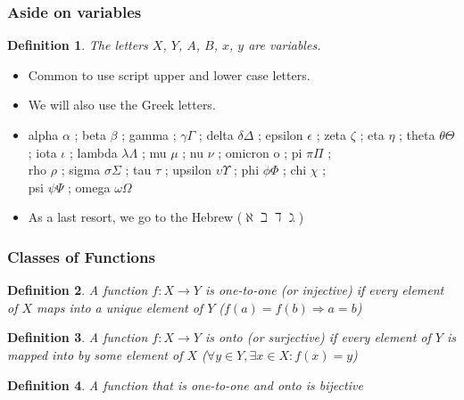 \documentclass[aspectratio=169]{beamer}
\newtheorem{defn}{Definition}
\numberwithin{equation}{section}
\begin{document}
\begin{frame}
\frametitle{Aside on variables}
\begin{defn}
The letters $X$, $Y$, $A$, $B$, $x$, $y$ are \emph{variables}.
\end{defn}
\pause

\begin{itemize}
\item Common to use script upper and lower case letters.
\item We will also use the Greek letters.

\item[] alpha $\alpha$ ; beta $\beta$ ; gamma ; $\gamma\Gamma$ ; delta $\delta\Delta$ ; epsilon $\epsilon$ ; zeta $\zeta$ ; eta $\eta$ ; theta $\theta\Theta$ ; iota $\iota$ ;  lambda $\lambda\Lambda$ ; mu $\mu$ ; nu $\nu$ ; omicron o ; pi $\pi\Pi$ ; \\
 rho $\rho$ ; sigma $\sigma\Sigma$ ; tau $\tau$ ; upsilon $\upsilon\Upsilon$ ; phi $\phi\Phi$ ; chi $\chi$  ;\\
 psi $\psi\Psi$ ; omega $\omega\Omega$
\item As a last resort, we go to the Hebrew ($\aleph \beth \daleth \gimel$)
\end{itemize}


\end{frame}



\begin{frame}
\frametitle{Classes of Functions}

\begin{defn}
A function $f: X\rightarrow Y$ is \textit{one-to-one} (or injective) if every element of $X$ maps into a unique element of $Y$ ($f(a)=f(b)\Rightarrow a=b$)
\end{defn}
\pause

\begin{defn}
A function $f: X\rightarrow Y$ is \textit{onto} (or surjective) if every element of $Y$ is mapped into by some element of $X$ ($\forall y\in Y, \exists x\in X: f(x)=y$) \pause
\end{defn}

\begin{defn}
A function that is \emph{one-to-one} and \emph{onto} is \emph{bijective}
\end{defn}

\end{frame}
\end{document}
